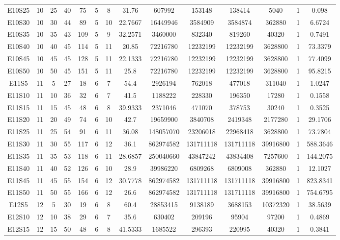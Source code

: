 \documentclass[letter, 10pt]{article}
\begin{document}
\begin{landscape}
\begin{longtable}{|c|c|c|c|c|c|c|c|c|c|c|c|c|c|}
E10S25 & 10 & 25 & 40 & 75 & 5 & 8 & 31.76 & 607992 & 153148 & 138414 & 5040 & 1 & 0.098 \\
E10S30 & 10 & 30 & 44 & 89 & 5 & 10 & 22.7667 & 16449946 & 3584909 & 3584874 & 362880 & 1 & 6.6724 \\
E10S35 & 10 & 35 & 43 & 109 & 5 & 9 & 32.2571 & 3460000 & 832340 & 819260 & 40320 & 1 & 0.7491 \\
E10S40 & 10 & 40 & 45 & 114 & 5 & 11 & 20.85 & 72216780 & 12232199 & 12232199 & 3628800 & 1 & 73.3379 \\
E10S45 & 10 & 45 & 45 & 128 & 5 & 11 & 22.1333 & 72216780 & 12232199 & 12232199 & 3628800 & 1 & 77.4099 \\
E10S50 & 10 & 50 & 45 & 151 & 5 & 11 & 25.8 & 72216780 & 12232199 & 12232199 & 3628800 & 1 & 95.8215 \\
E11S5 & 11 & 5 & 27 & 18 & 6 & 7 & 54.4 & 2926194 & 762018 & 477018 & 311040 & 1 & 1.0247 \\
E11S10 & 11 & 10 & 36 & 32 & 6 & 7 & 41.5 & 1188222 & 228330 & 196350 & 17280 & 1 & 0.1558 \\
E11S15 & 11 & 15 & 45 & 48 & 6 & 8 & 39.9333 & 2371046 & 471070 & 378753 & 30240 & 1 & 0.3525 \\
E11S20 & 11 & 20 & 49 & 74 & 6 & 10 & 42.7 & 19659900 & 3840708 & 2419348 & 2177280 & 1 & 29.1706 \\
E11S25 & 11 & 25 & 54 & 91 & 6 & 11 & 36.08 & 148057070 & 23206018 & 22968418 & 3628800 & 1 & 73.7804 \\
E11S30 & 11 & 30 & 55 & 117 & 6 & 12 & 36.1 & 862974582 & 131711118 & 131711118 & 39916800 & 1 & 588.3646 \\
E11S35 & 11 & 35 & 53 & 118 & 6 & 11 & 28.6857 & 250040660 & 43847242 & 43834408 & 7257600 & 1 & 144.2075 \\
E11S40 & 11 & 40 & 52 & 126 & 6 & 10 & 28.9 & 39986220 & 6809268 & 6809008 & 362880 & 1 & 12.1027 \\
E11S45 & 11 & 45 & 55 & 154 & 6 & 12 & 30.7778 & 862974582 & 131711118 & 131711118 & 39916800 & 1 & 823.8341 \\
E11S50 & 11 & 50 & 55 & 166 & 6 & 12 & 26.6 & 862974582 & 131711118 & 131711118 & 39916800 & 1 & 754.6795 \\
E12S5 & 12 & 5 & 30 & 19 & 6 & 8 & 60.4 & 28853415 & 9138189 & 3688153 & 10372320 & 1 & 38.5639 \\
E12S10 & 12 & 10 & 38 & 29 & 6 & 7 & 35.6 & 630402 & 209196 & 95904 & 97200 & 1 & 0.4869 \\
E12S15 & 12 & 15 & 50 & 48 & 6 & 8 & 41.5333 & 1685522 & 296393 & 220995 & 40320 & 1 & 0.3841 \\

\end{longtable}
\end{landscape}
\end{document}
